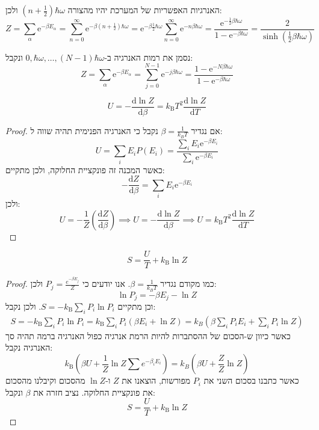 \documentclass{tstextbook}
\begin{document}
\begin{example}
האנרגיות האפשריות של המערכת יהיו מהצורה \(\left( n+\frac{1}{2} \right)\hbar \omega\) ולכן:
$$Z=\sum_{\alpha}\mathrm{e}^{-\beta E_{\alpha}}=\sum_{n=0}^{\infty}\mathrm{e}^{-\beta\left( n+\frac{1}{2} \right)\hbar\omega}=\mathrm{e}^{-\beta\frac{1}{2}\hbar\omega}\sum_{n=0}^{\infty}\mathrm{e}^{-n\beta\hbar\omega}=\frac{\mathrm{e}^{-\frac{1}{2}\beta\hbar\omega}}{1-\mathrm{e}^{-\beta\hbar\omega}}=\frac{2}{\sinh\left( \frac{1}{2}\beta\hbar \omega \right)}$$

\end{example}
\begin{example}
נסמן את רמות האנרגיה ב-\(0,\hbar {\omega},\dots,(N-1)\hbar \omega\) ונקבל:
$$Z=\sum_{\alpha}\mathrm{e}^{-\beta E_{\alpha}}=\sum_{j=0}^{N-1}\mathrm{e}^{-j\beta\hbar\omega}=\frac{1-\mathrm{e}^{-N\beta\hbar\omega}}{1-\mathrm{e}^{-\beta\hbar\omega}}$$

\end{example}
\begin{proposition}
$$U=-\frac{\mathrm{d} \ln Z}{\mathrm{d} \beta} =k_{\mathrm{B}}T^{2}{\frac{\mathrm{d}\ln Z}{\mathrm{d}T}}$$

\end{proposition}
\begin{proof}
אם נגדיר \(\beta=\frac{1}{k_{B}T}\) נקבל כי האנרגיה הפנימית תהיה שווה ל:
$$U=\sum_{i}E_{i}P(E_{i})=\frac{\sum_{i}E_{i}\mathrm{e}^{-\beta E_{i}}}{\sum_{i}\mathrm{e}^{-\beta E_{i}}}$$
כאשר המכנה זה פונקציית החלוקה, ולכן מתקיים:
$$-{\frac{\mathrm{d}Z}{\mathrm{d}\beta}}=\sum_{i}E_{i}\mathrm{e}^{-\beta E_{i}}$$
ולכן:
$$U=-\frac{1}{Z}\left( \frac{\mathrm{d} Z}{\mathrm{d} \beta}  \right)\implies U=-\frac{\mathrm{d} \ln Z}{\mathrm{d} \beta} \implies U=k_{\mathrm{B}}T^{2}{\frac{\mathrm{d}\ln Z}{\mathrm{d}T}}$$

\end{proof}
\begin{proposition}
$$S={\frac{U}{T}}+k_{\mathrm{B}}\ln Z$$

\end{proposition}
\begin{proof}
כמו מקודם נגדיר \(\beta = \frac{1}{k_{B}T}\). אנו יודעים כי \(P_{j}=\frac{e^{ -\beta E_{j} }}{Z}\) ולכן:
$$\ln{ P}_{j}=-\beta E_{j}-\ln Z$$
וכן מתקיים \(S=-k_{\mathrm{B}}\sum_{i}P_{i}\ln P_{i}\). ולכן נקבל:
$$\begin{gather}{{S}}={{-k_{\mathrm{B}}\sum_{i}P_{i}\ln P_{i}}}= k_{\mathrm{B}}\sum_{i}P_{i}\left( \beta E_{i}+\ln Z \right)= k_{B}\left( \beta \sum_{i}P_{i}E_{i}+\sum_{i}P_{i}\ln Z \right)
\end{gather}$$
כאשר כיוון ש-הסכום של ההסתברות להיות הרמת אנרגיה כפול האנרגיה ברמה תהיה סך האנרגיה נקבל:
$$k_{\mathrm{{B}}}\left( \beta U+\frac{1}{Z} \ln Z\sum e^{ -\beta_{i}E_{i} } \right) =k_{B}\left( \beta U+ \frac{Z}{Z}\ln Z \right)$$
כאשר כתבנו בסכום השני את \(P_{i}\) מפורשות, הוצאנו את \(Z\) ו-\(\ln Z\) מהסכום וקיבלנו מהסכום את פונקציית החלוקה. נציב חזרה את \(\beta\) ונקבל:
$$S={\frac{U}{T}}+k_{\mathrm{B}}\ln Z$$

\end{proof}
\end{document}
